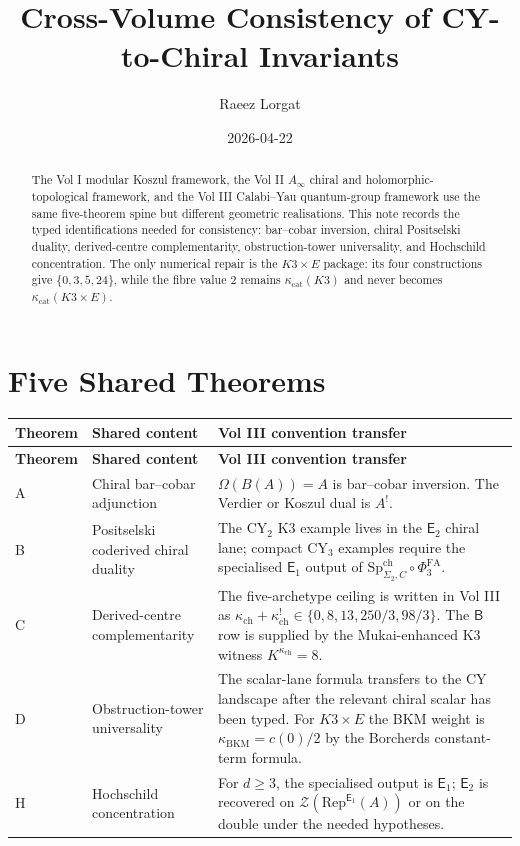 \documentclass[11pt]{article}
\title{Cross-Volume Consistency of CY-to-Chiral Invariants}
\author{Raeez Lorgat}
\date{2026-04-22}
\providecommand{\Eone}{\mathsf{E}_1}
\providecommand{\Etwo}{\mathsf{E}_2}
\providecommand{\SpCh}{\mathrm{Sp}^{\mathrm{ch}}}
\providecommand{\PhiFA}{\Phi^{\mathrm{FA}}}
\providecommand{\kch}{\kappa_{\mathrm{ch}}}
\providecommand{\kcat}{\kappa_{\mathrm{cat}}}
\providecommand{\kBKM}{\kappa_{\mathrm{BKM}}}
\providecommand{\KD}{K^{\kappa_{\mathrm{ch}}}}
\begin{document}
\maketitle

\begin{abstract}
The Vol I modular Koszul framework, the Vol II
$A_\infty$ chiral and holomorphic-topological framework, and the Vol III
Calabi--Yau quantum-group framework use the same five-theorem spine but
different geometric realisations. This note records the typed
identifications needed for consistency: bar--cobar inversion, chiral
Positselski duality, derived-centre complementarity, obstruction-tower
universality, and Hochschild concentration. The only numerical repair is
the $K3\times E$ package: its four constructions give
$\{0,3,5,24\}$, while the fibre value $2$ remains
$\kcat(K3)$ and never becomes $\kcat(K3\times E)$.
\end{abstract}

\section{Five Shared Theorems}
\label{sec:five-theorems}

\renewcommand{\arraystretch}{1.2}
\begin{longtable}{@{}p{}p{}p{}@{}}
\toprule
\textbf{Theorem} & \textbf{Shared content} & \textbf{Vol III convention transfer}\\
\midrule
\endfirsthead
\toprule
\textbf{Theorem} & \textbf{Shared content} & \textbf{Vol III convention transfer}\\
\midrule
\endhead
A & Chiral bar--cobar adjunction &
$\Omega(B(A))=A$ is bar--cobar inversion. The Verdier or Koszul dual is
$A^!$.\\[1ex]
B & Positselski coderived chiral duality &
The CY$_2$ K3 example lives in the $\Etwo$ chiral lane; compact
CY$_3$ examples require the specialised $\Eone$ output of
$\SpCh_{\Sigma_2,C}\circ\PhiFA_3$.\\[1ex]
C & Derived-centre complementarity &
The five-archetype ceiling is written in Vol III as
$\kch+\kch^!\in\{0,8,13,250/3,98/3\}$. The $\mathsf B$ row is supplied
by the Mukai-enhanced K3 witness $\KD=8$.\\[1ex]
D & Obstruction-tower universality &
The scalar-lane formula transfers to the CY landscape after the relevant
chiral scalar has been typed. For $K3\times E$ the BKM weight is
$\kBKM=c(0)/2$ by the Borcherds constant-term formula.\\[1ex]
H & Hochschild concentration &
For $d\ge 3$, the specialised output is $\Eone$; $\Etwo$ is recovered
on $\mathcal Z(\mathrm{Rep}^{\Eone}(A))$ or on the double under the
needed hypotheses.\\
\bottomrule
\end{longtable}
\end{document}

